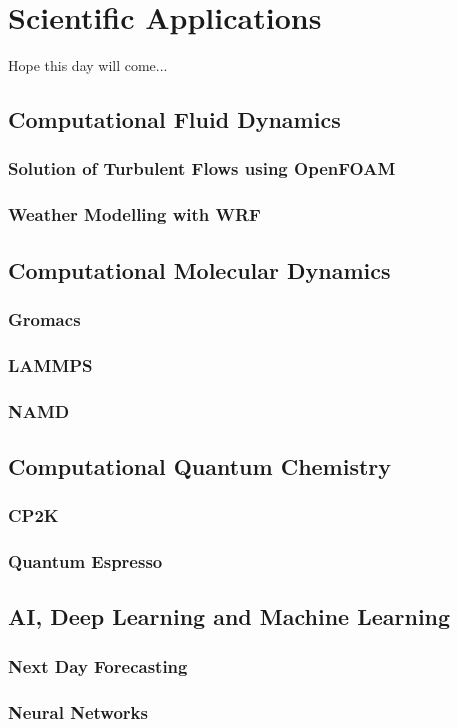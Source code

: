 \chapter{Scientific Applications} \label{chap-applications}
Hope this day will come...

\section{Computational Fluid Dynamics}
\subsection{Solution of Turbulent Flows using OpenFOAM}
\subsection{Weather Modelling with WRF}

\section{Computational Molecular Dynamics}
\subsection{Gromacs}
\subsection{LAMMPS}
\subsection{NAMD}

\section{Computational Quantum Chemistry}
\subsection{CP2K}
\subsection{Quantum Espresso}

\section{AI, Deep Learning and Machine Learning}
\subsection{Next Day Forecasting}
\subsection{Neural Networks}
